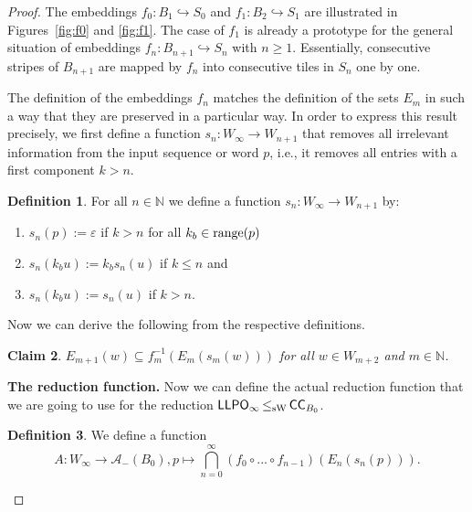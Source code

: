 \documentclass[a4paper]{amsart}
\def\AA{{\mathcal A}}
\def\IN{{\mathbb{N}}}
\def\In{\subseteq}
\def\into{\hookrightarrow}
\def\range{{\rm range}}
\def\LLPO{\text{\rm\sffamily LLPO}}
\def\ConC{\mbox{\rm\sffamily CC}}
\def\LLPO{\mbox{\rm\sffamily LLPO}}
\def\leqSW{\mathop{\leq_{\mathrm{sW}}}}
\newtheorem{localclaim}{Claim}[theorem]
\theoremstyle{definition}
\newtheorem{localdef}[localclaim]{Definition}
\begin{document}
\begin{proof}
The embeddings $f_0:B_1\into S_0$ and $f_1:B_2\into S_1$ are illustrated in Figures~\ref{fig:f0} and \ref{fig:f1}.
The case of $f_1$ is already a prototype for the general situation of embeddings $f_n:B_{n+1}\into S_n$ with $n\geq1$.
Essentially, consecutive stripes of $B_{n+1}$ are mapped by $f_n$ into consecutive tiles in $S_n$ one by one.

The definition of the embeddings $f_n$ matches the definition of the sets $E_m$ in such a way that they are preserved
in a particular way. In order to express this result precisely, we first define a function $s_n:W_\infty\to W_{n +1}$ that removes
all irrelevant information from the input sequence or word $p$, i.e., it removes all entries with a first
component $k>n$.

\begin{localdef}
For all $n\in\IN$ we define a function $s_n:W_\infty\to W_{n+1}$ by:
\begin{enumerate}
\item $s_n(p):=\varepsilon$ if $k>n$ for all $k_b\in\range(p)$
\item $s_n(k_bu):=k_bs_n(u)$ if $k\leq n$ and
\item $s_n(k_bu):=s_n(u)$ if $k>n$.
\end{enumerate}
\end{localdef}

Now we can derive the following from the respective definitions. 

\begin{localclaim}
\label{claim:dim2-8}
$E_{m+1}(w)\In f_m^{-1}(E_m(s_m(w)))$ for all $w\in W_{m+2}$ and $m\in\IN$.
\end{localclaim}

\noindent
{\bf The reduction function.}
Now we can define the actual reduction function that we are going to use for the reduction
$\LLPO_\infty\leqSW\ConC_{B_0}$.

\begin{localdef}
We define a function 
\[A:W_\infty\to\AA_-(B_0),p\mapsto\bigcap_{n=0}^\infty (f_0\circ...\circ f_{n-1})(E_n(s_n(p))).\]
\end{localdef}


\end{proof}
\end{document}
